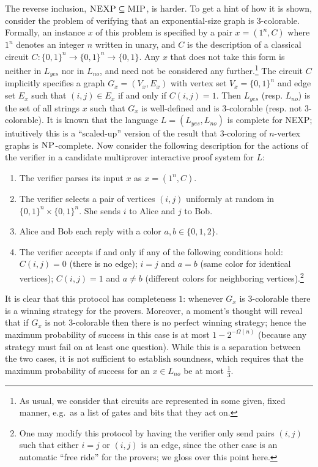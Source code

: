 The reverse inclusion, $\textsc{NEXP}\subseteq \textsc{MIP}$, is harder. To get a hint of how it is shown, consider the problem of verifying that an exponential-size graph is $3$-colorable. Formally, an instance $x$ of this problem is specified by a pair $x=(1^n,C)$ where $1^n$ denotes an integer $n$ written in unary, and $C$ is the description of a classical circuit $C:\{0,1\}^n \to \{0,1\}^n \to \{0,1\}$. Any $x$ that does not take this form is neither in $L_{yes}$ nor in $L_{no}$, and need not be considered any further.\footnote{As usual, we consider that circuits are represented in some given, fixed manner, e.g.\ as a list of gates and bits that they act on.}  The circuit $C$ implicitly specifies a graph $G_x = (V_x,E_x)$ with vertex set $V_x = \{0,1\}^n$ and edge set $E_x$ such that $(i,j)\in E_x$ if and only if $C(i,j)=1$. Then $L_{yes}$ (resp. $L_{no}$) is the set of all strings $x$ such that $G_x$ is well-defined and is $3$-colorable (resp. not $3$-colorable). It is known that the language $L=(L_{yes},L_{no})$ is complete for NEXP; intuitively this is a ``scaled-up'' version of the result that $3$-coloring of $n$-vertex graphs is $\textsc{NP}$-complete. Now consider the following description for the actions of the verifier in a candidate multiprover interactive proof system for $L$: 
\begin{enumerate}
\item The verifier parses its input $x$ as $x=(1^n,C)$. 
\item The verifier selects a pair of vertices $(i,j)$ uniformly at random in $\{0,1\}^n\times \{0,1\}^n$. She sends $i$ to Alice and $j$ to Bob.
\item Alice and Bob each reply with a color $a,b\in \{0,1,2\}$. 
\item The verifier accepts if and only if any of the following conditions hold: $C(i,j)=0$ (there is no edge); $i=j$ and $a=b$ (same color for identical vertices); $C(i,j)=1$ and $a\neq b$ (different colors for neighboring vertices).\footnote{One may modify this protocol by having the verifier only send pairs $(i,j)$ such that either $i=j$ or $(i,j)$ is an edge, since the other case is an automatic ``free ride'' for the provers; we gloss over this point here.}
\end{enumerate}
It is clear that this protocol has completeness $1$: whenever $G_x$ is $3$-colorable there is a winning strategy for the provers. Moreover, a moment's thought will reveal that if $G_x$ is not $3$-colorable then there is no perfect winning strategy; hence the maximum probability of success in this case is at most $1-2^{-\Omega(n)}$ (because any strategy must fail on at least one question). While this is a separation between the two cases, it is not sufficient to establish soundness, which requires that the maximum probability of success for an $x\in L_{no}$ be at most $\frac{1}{3}$. 

